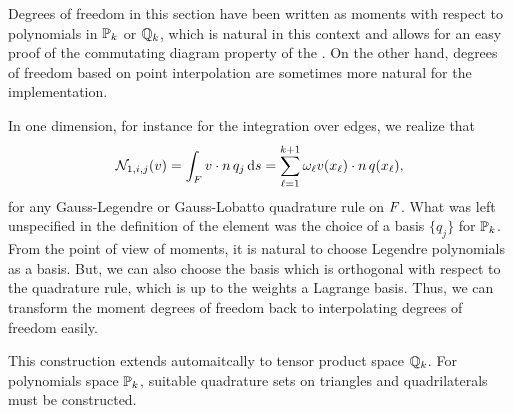 \begin{remark}
  Degrees of freedom in this section have been written as moments with
  respect to polynomials in $\P_k$ or $\Q_k$, which is natural in this
  context and allows for an easy proof of the commutating diagram
  property of the . On the other hand,
  degrees of freedom based on point interpolation are sometimes more
  natural for the implementation.

  In one dimension, for instance for the integration over edges, we
  realize that
  \begin{gather*}
    \nodal_{1,i,j} (v) = \int_{\face} v\cdot\n \,q_j \ds
    = \sum_{\ell=1}^{k+1} \omega_\ell v(x_\ell)\cdot\n\,q(x_\ell),
  \end{gather*}
  for any Gauss-Legendre or Gauss-Lobatto quadrature rule on
  $\face$. What was left unspecified in the definition of the element
  was the choice of a basis $\{q_j\}$ for $\P_k$. From the point of
  view of moments, it is natural to choose Legendre polynomials as a
  basis. But, we can also choose the basis which is orthogonal with
  respect to the quadrature rule, which is up to the weights a
  Lagrange basis. Thus, we can transform the moment degrees of freedom
  back to interpolating degrees of freedom easily.
  
  This construction extends automaitcally to tensor product space
  $\Q_k$. For polynomials space $\P_k$, suitable quadrature sets on
  triangles and quadrilaterals must be constructed.
\end{remark}



